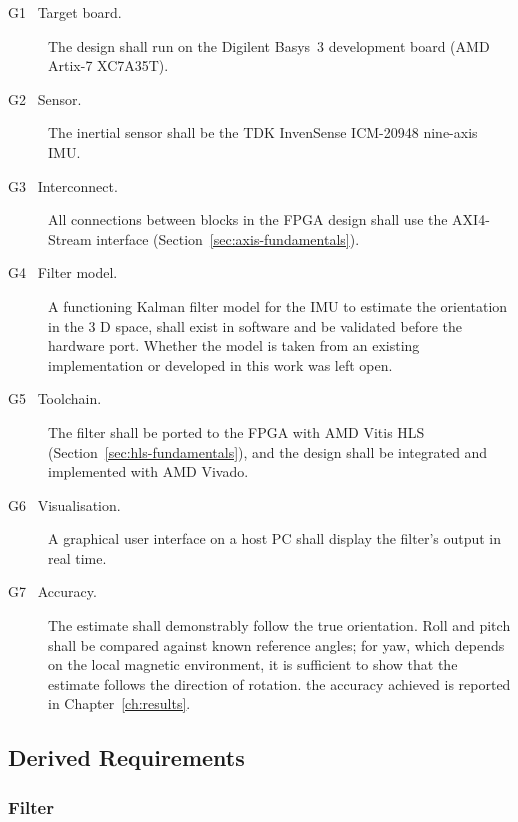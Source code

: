 \documentclass[12pt,a4paper]{article}
\begin{document}
\begin{description}
  \item[G1 \ Target board.] The design shall run on the Digilent
        Basys~3 development board (AMD Artix-7 XC7A35T).
  \item[G2 \ Sensor.] The inertial sensor shall be the TDK
        InvenSense ICM-20948 nine-axis IMU.
  \item[G3 \ Interconnect.] All connections between blocks in the
        FPGA design shall use the AXI4-Stream interface
        (Section~\ref{sec:axis-fundamentals}).
  \item[G4 \ Filter model.] A functioning Kalman filter model for
        the IMU to estimate the orientation in the 3 D space, shall exist in software and be validated before the
        hardware port. Whether the model is taken from an existing
        implementation or developed in this work was left open.
  \item[G5 \ Toolchain.] The filter shall be ported to the FPGA with
        AMD Vitis HLS (Section~\ref{sec:hls-fundamentals}), and the
        design shall be integrated and implemented with AMD Vivado.
  \item[G6 \ Visualisation.] A graphical user interface on a host PC
        shall display the filter's output in real time.
  \item[G7 \ Accuracy.] The estimate shall demonstrably follow the
        true orientation. Roll and pitch shall be compared against
        known reference angles; for yaw, which depends on the local
        magnetic environment, it is sufficient to show that the
        estimate follows the direction of rotation. the accuracy achieved is reported in Chapter~\ref{ch:results}.
\end{description}

\subsection{Derived Requirements}
\label{sec:req-derived}

\subsubsection{Filter}
\end{document}
